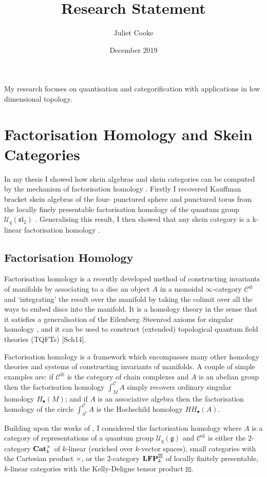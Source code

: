 \documentclass{article}
\title{Research Statement}
\author{Juliet Cooke}
\date{December 2019}
\newcommand{\catname}[1]{{\normalfont\textbf{#1}}}
\newcommand{\Cat}{\catname{Cat}}
\newcommand{\LFP}{\catname{LFP}}
\newcommand{\slgroup}{\mathfrak{sl}}
\begin{document}
\maketitle

My research focuses on quantisation and categorification with applications in low dimensional topology. 

\section{Factorisation Homology and Skein Categories}

In my thesis I showed how skein algebras and skein categories can be computed by the mechanism of factorisation homology \cite{CookeThesis}. Firstly I recovered Kauffman bracket skein algebras of the four- punctured sphere and punctured torus from the locally finely presentable factorisation homology of the quantum group $\mathcal{U}_q(\slgroup_2)$ \cite{C1}. Generalising this result, I then showed that any skein category is a k-linear factorisation homology \cite{C2}.

\subsection{Factorisation Homology}

Factorisation homology is a recently developed method of constructing invariants of manifolds by associating to a disc an object $A$ in a monoidal $\infty$-category $\mathscr{C}^{\otimes}$ and ‘integrating’ the result over the manifold by taking the colimit over all the ways to embed discs into the manifold. It is a homology theory in the sense that it satisfies a generalisation of the Eilenberg–Steenrod axioms for singular homology \cite{AyalaFrancis2015}, and it can be used to construct (extended) topological quantum field theories (TQFTs) [Sch14]. 

Factorisation homology is a framework which encompasses many other homology theories and systems of constructing invariants of manifolds. A couple of simple examples are: if $\mathscr{C}^{\otimes}$ is the category of chain complexes and $A$ is an abelian group then the factorisation homology $\int^{\mathscr{C}}_M A$ simply recovers ordinary singular homology $H_{\bullet}(M)$; and if $A$ is an associative algebra then the factorisation homology of the circle $\int^{\mathscr{C}}_{S^1} A$ is the Hochschild homology $HH_{\bullet}(A)$. 

Building upon the works of \cite{david1}, I considered the factorisation homology where $A$ is a category of representations of a quantum group $\mathcal{U}_q(\mathfrak{g})$ and $\mathscr{C}^{\otimes}$ is either the $2$-category  $\Cat_k^{\times}$ of $k$-linear (enriched over $k$-vector spaces), small categories with the Cartesian product $\times$, or the $2$-category  $\LFP_k^{\boxtimes}$  of locally finitely presentable, $k$-linear categories with the Kelly-Deligne tensor product $\boxtimes$.
\end{document}

